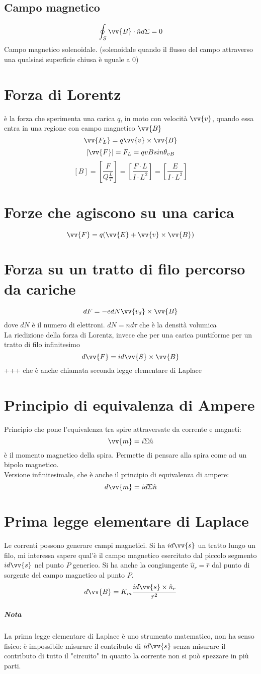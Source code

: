 \documentclass[a4paper]{report}
\begin{document}
  \subsection{Campo magnetico}
  $$ \oint_S \vv{B}\cdot \hat{n} d\Sigma = 0 $$
  Campo magnetico solenoidale. (solenoidale quando il flusso del campo attraverso una qualsiasi superficie chiusa è uguale a 0)

  \section{Forza di Lorentz}
  è la forza che sperimenta una carica $q$, in moto con velocità $\vv{v}$, quando essa entra in una regione con campo magnetico $\vv{B}$
  $$ \vv{F_L} = q\vv{v} \times \vv{B} $$
  $$ |\vv{F}| = F_L = qvB sin\theta_{vB} $$
  $$ [B] = [\frac{F}{Q\frac{L}{T}}] = [\frac{F\cdot L}{I\cdot L^2}] = [\frac{E}{I\cdot L^2}] $$

  \section{Forze che agiscono su una carica}
  $$ \vv{F} = q(\vv{E} + \vv{v} \times \vv{B}) $$

  \section{Forza su un tratto di filo percorso da cariche}
  $$ dF = -e dN \vv{v_d} \times \vv{B}$$
  dove $dN$ è il numero di elettroni. $dN = nd\tau$ che è la densità volumica\\
  La riedizione della forza di Lorentz, invece che per una carica puntiforme per un tratto di filo infinitesimo
  $$ d\vv{F} = i d\vv{S} \times \vv{B} $$+++
  che è anche chiamata seconda legge elementare di Laplace

  \section{Principio di equivalenza di Ampere}
  Principio che pone l'equivalenza tra spire attraversate da corrente e magneti:
  $$ \vv{m} = i \Sigma \hat{n} $$
  è il momento magnetico della spira. Permette di pensare alla spira come ad un bipolo magnetico.\\
  Versione infinitesimale, che è anche il principio di equivalenza di ampere:
  $$ d\vv{m} = id\Sigma \hat{n} $$

  \section{Prima legge elementare di Laplace}
  Le correnti possono generare campi magnetici.
  Si ha $id\vv{s}$ un tratto lungo un filo, mi interessa sapere qual'è il campo magnetico esercitato dal piccolo segmento $id\vv{s}$ nel punto $P$ generico. Si ha anche la congiungente $\hat{u}_r=\hat{r}$ dal punto di sorgente del campo magnetico al punto $P$.
  $$ d\vv{B} = K_m \frac{id\vv{s} \times \hat{u}_r}{r^2} $$
  \subparagraph{Nota}
  La prima legge elementare di Laplace è uno strumento matematico, non ha senso fisico: è impossibile misurare il contributo di $id\vv{s}$ senza misurare il contributo di tutto il "circuito" in quanto la corrente non si può spezzare in più parti.
\end{document}
